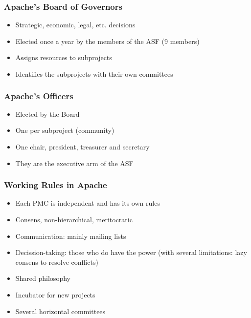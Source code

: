 \documentclass{beamer}
\begin{document}

\begin{frame}
\frametitle{Apache's Board of Governors}

\begin{itemize}
\item Strategic, economic, legal, etc. decisions
\item Elected once a year by the members of the ASF (9 members)
\item Assigns resources to subprojects
\item Identifies the subprojects with their own committees
\end{itemize}

\end{frame}


\begin{frame}
\frametitle{Apache's Officers}

\begin{itemize}
\item Elected by the Board
\item One per subproject (community)
\item One chair, president, treasurer and secretary
\item They are the executive arm of the ASF
\end{itemize}

\end{frame}


\begin{frame}
\frametitle{Working Rules in Apache}

\begin{itemize}
\item Each PMC is independent and has its own rules
\item Consens, non-hierarchical, meritocratic
\item Communication: mainly mailing lists
\item Decission-taking: those who do have the power (with several limitations: lazy consens to resolve conflicts)
\item Shared philosophy
\item Incubator for new projects
\item Several horizontal committees
\end{itemize}

\end{frame}
\end{document}
